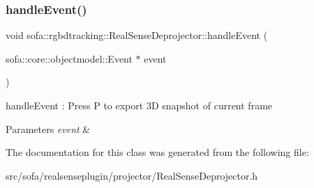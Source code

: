 \subsubsection{\texorpdfstring{handle\+Event()}{handleEvent()}}
{\footnotesize\ttfamily void sofa\+::rgbdtracking\+::\+Real\+Sense\+Deprojector\+::handle\+Event (\begin{DoxyParamCaption}\item[{sofa\+::core\+::objectmodel\+::\+Event $\ast$}]{event }\end{DoxyParamCaption})\hspace{0.3cm}{\ttfamily [inline]}}



handle\+Event \+: Press P to export 3D snapshot of current frame 


\begin{DoxyParams}{Parameters}
{\em event} & \\
\hline
\end{DoxyParams}


The documentation for this class was generated from the following file\+:\begin{DoxyCompactItemize}
\item 
src/sofa/realsenseplugin/projector/Real\+Sense\+Deprojector.\+h\end{DoxyCompactItemize}
